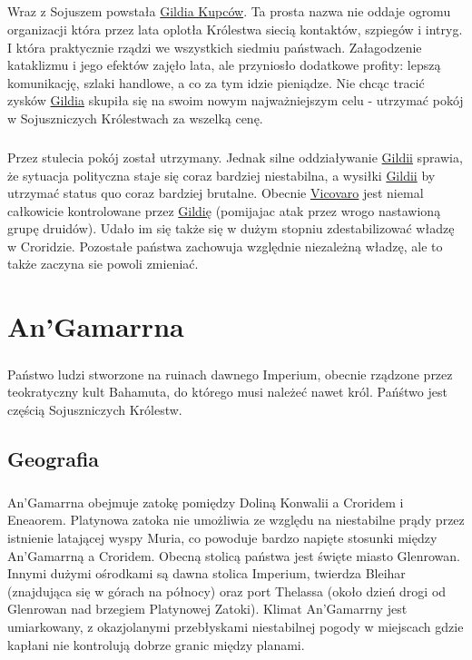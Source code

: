 \paragraph{}
Wraz z Sojuszem powstała \hyperref[GildiaKupcow]{Gildia Kupców}.
Ta prosta nazwa nie oddaje ogromu organizacji która przez lata oplotła Królestwa siecią kontaktów, szpiegów i intryg.
I która praktycznie rządzi we wszystkich siedmiu państwach.
Załagodzenie kataklizmu i jego efektów zajęło lata, ale przyniosło dodatkowe profity: lepszą komunikację, szlaki handlowe, a co za tym idzie pieniądze.
Nie chcąc tracić zysków \hyperref[GildiaKupcow]{Gildia} skupiła się na swoim nowym najważniejszym celu - utrzymać pokój w Sojuszniczych Królestwach za wszelką cenę.

\paragraph{}
Przez stulecia pokój został utrzymany.
Jednak silne oddziaływanie \hyperref[GildiaKupcow]{Gildii} sprawia, że sytuacja polityczna staje się coraz bardziej niestabilna, a wysiłki \hyperref[GildiaKupcow]{Gildii} by utrzymać status quo coraz bardziej brutalne.
Obecnie \hyperref[Vicovaro]{Vicovaro} jest niemal całkowicie kontrolowane przez \hyperref[GildiaKupcow]{Gildię} (pomijajac atak przez wrogo nastawioną grupę druidów).
Udało im się także się w dużym stopniu zdestabilizować władzę w Croridzie.
Pozostałe państwa zachowuja względnie niezależną władzę, ale to także zaczyna sie powoli zmieniać.

\chapter{An'Gamarrna}
\label{AnGamarrna}

\paragraph{}
Państwo ludzi stworzone na ruinach dawnego Imperium, obecnie rządzone przez teokratyczny kult Bahamuta, do którego musi należeć nawet król.
Pańśtwo jest częścią Sojuszniczych Królestw.

\section{Geografia}
\paragraph{}
An'Gamarrna obejmuje zatokę pomiędzy Doliną Konwalii a Croridem i Eneaorem.
Platynowa zatoka nie umożliwia ze względu na niestabilne prądy przez istnienie latającej wyspy Muria, co powoduje bardzo napięte stosunki między An'Gamarrną a Croridem.
Obecną stolicą państwa jest święte miasto Glenrowan.
Innymi dużymi ośrodkami są dawna stolica Imperium, twierdza Bleihar (znajdująca się w górach na północy) oraz port Thelassa (około dzień drogi od Glenrowan nad brzegiem Platynowej Zatoki).
Klimat An'Gamarrny jest umiarkowany, z okazjolanymi przebłyskami niestabilnej pogody w miejscach gdzie kapłani nie kontrolują dobrze granic między planami.

